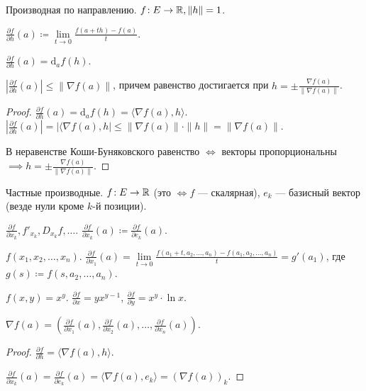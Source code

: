 \begin{definition}
    Производная по направлению. $f\!: E \to \mathbb{R}, \|h\|=1$.

     $\frac{\partial f}{\partial h}(a) \coloneqq \lim\limits_{t \to 0} \frac{f(a+th) - f(a)}{t}$.
\end{definition}
\begin{remark}
    $\frac{\partial f}{\partial h}(a) = \mathrm{d}_af(h)$.
\end{remark}
\begin{theorem}
    $\left| \frac{\partial f}{\partial h}(a) \right| \le \|\nabla f(a)\|$, причем равенство достигается при $h = \pm \frac{\nabla f(a)}{\|\nabla f(a)\|}$.
\end{theorem}
\begin{proof}
    $\frac{\partial f}{\partial h}(a) = \mathrm{d}_af(h) = \langle \nabla f(a), h \rangle$.
\\
    $\left| \frac{\partial f}{\partial h}(a) \right| = | \langle \nabla f(a), h| \le \|\nabla f(a) \| \cdot \|h\| = \|\nabla f(a)\|$.

    В неравенстве Коши-Буняковского равенство $\iff$ векторы пропорциональны  $\implies h = \pm \frac{\nabla f(a)}{\|\nabla f(a)\|}$.
\end{proof}
\begin{definition}
    Частные производные. $f\!: E \to \mathbb{R}$ (это $\iff f$ --- скалярная), $e_k$ --- базисный вектор (везде нули кроме $k$-й позиции).

     $\frac{\partial f}{\partial x_k}, f'_{x_k}, D_{x_k}f,\ldots$. $\frac{\partial f}{\partial x_k} (a) \coloneqq \frac{\partial f}{\partial e_k}(a)$.
\end{definition}
\begin{remark}
    $f(x_1, x_2, \ldots, x_n)$. $\frac{\partial f}{\partial x_1}(a) = \lim\limits_{t \to 0} \frac{f(a_1 + t, a_2, \ldots,a_n) - f(a_1, a_2,\ldots, a_n)}{t} = g'(a_1)$, где $g(s) \coloneqq f(s, a_2, \ldots, a_n)$.
\end{remark}
\begin{example}
    $f(x, y) = x^y$.  $\frac{\partial f}{\partial x} = yx^{y-1}$, $\frac{\partial f}{\partial y} = x^y \cdot \ln x$.
\end{example}
\begin{theorem}
    $\nabla f(a) = \left( \frac{\partial f}{\partial x_1}(a), \frac{\partial f}{\partial x_2}(a), \ldots, \frac{\partial f}{\partial x_n}(a) \right)$.
\end{theorem}
\begin{proof}
   $\frac{\partial f}{\partial h} = \langle \nabla f(a), h \rangle$.

   $\frac{\partial f}{\partial x_k}(a) = \frac{\partial f}{\partial e_k}(a) = \langle \nabla f(a), e_k \rangle = (\nabla f(a))_k$.
\end{proof}
